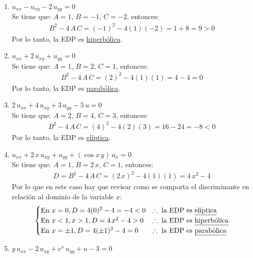 \begin{enumerate}[label=\alph*)]
\item {\Large{$u_{xx} - u_{xy} - 2 \, u_{yy} = 0$}}
\\
Se tiene que: $A = 1$, $B = -1$, $C = -2$, entonces:
\begin{align*}
B^{2} -  4 \, A \, C = (-1)^{2} - 4 (1)(-2) = 1 + 8 = 9 > 0
\end{align*}
Por lo tanto, la EDP es \underline{hiperbólica}.
\item {\Large{$u_{xx} + 2 \, u_{xy} + u_{yy} = 0$}}
\\
Se tiene que: $A = 1$, $B = 2$, $C = 1$, entonces:
\begin{align*}
B^{2} -  4 \, A \, C = (2)^{2} - 4 (1)(1) = 4 - 4 = 0
\end{align*}
Por lo tanto, la EDP es \underline{parabólica}.
\item {\Large{$2 \, u_{xx} + 4 \, u_{xy} + 3 \, u_{yy} - 5 \, u = 0$}}
\\
Se tiene que: $A = 2$, $B = 4$, $C = 3$, entonces:
\begin{align*}
B^{2} -  4 \, A \, C = (4)^{2} - 4 (2)(3) = 16 - 24 = -8 < 0
\end{align*}
Por lo tanto, la EDP es \underline{elíptica}.
\item {\Large{$u_{xx} + 2 \, x \, u_{xy} + u_{yy} + (\cos x \, y) \, u_{x} = 0$}}
\\
Se tiene que: $A = 1$, $B = 2 \, x$, $C = 1$, entonces:
\begin{align*}
D = B^{2} -  4 \, A \, C = (2 \, x)^{2} - 4 (1)(1) = 4 \, x^{2} - 4
\end{align*}
Por lo que en este caso hay que revisar como se comporta el discriminante en relación al dominio de la variable $x$:
\begin{align*}
\begin{cases}
\mbox{En } x = 0, D = 4 (0)^{2} - 4 = - 4 < 0 & \therefore \text{ la EDP es \underline{elíptica}} \\
\mbox{En } x < 1, x > 1, D = 4 \, x^{2} - 4 > 0 & \therefore \text{ la EDP es \underline{hiperbólica}} \\
\mbox{En } x = \pm 1, D = 4 (\pm 1)^{2} - 4 = 0 & \therefore \text{ la EDP es \underline{parabólica}} \\
\end{cases}
\end{align*}
\item {\Large{$y \, u_{xx} - 2 \, u_{xy} + e^{x} \, u_{yy} + u - 3 = 0$}}
\\

\end{enumerate}
